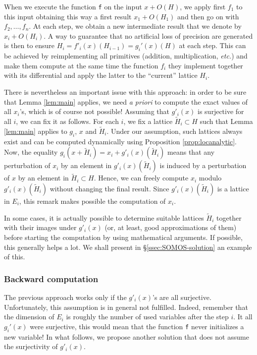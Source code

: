 \documentclass{lms}
\begin{document}
When we execute the function {\tt f} on the input $x + O(H)$, we apply 
first $f_1$ to this input obtaining this way a first result $x_1 + 
O(H_1)$ and then go on with $f_2, \ldots, f_n$. At each step, we obtain 
a new intermediate result that we denote by $x_i + O(H_i)$. A way to 
guarantee that no artificial loss of precision are generated is then to 
ensure $H_i = f'_i(x)(H_{i-1}) = g_i'(x)(H)$ at each step. This can be 
achieved by reimplementing all primitives (addition, multiplication, 
\emph{etc.}) and make them compute at the same time the function $f_i$
they implement together with its differential and apply the latter to
the ``current'' lattice $H_i$.

There is nevertheless an important issue with this approach: in order to 
be sure that Lemma \ref{lem:main} applies, we need \emph{a priori} to 
compute the exact values of all $x_i$'s, which is of course not possible! 
Assuming that $g'_i(x)$ is surjective for all $i$, we can fix it as 
follows. For each $i$, we fix a lattice $\tilde H_i \subset H$ such that 
Lemma \ref{lem:main} applies to $g_i$, $x$ and $\tilde H_i$. Under our 
assumption, such lattices always exist and can be computed dynamically 
using Proposition \ref{prop:locanalytic}. Now, the equality $g_i(x + 
\tilde H_i) = x_i + g'_i(x)(\tilde H_i)$ means that any perturbation of 
$x_i$ by an element in $g'_i(x) (\tilde H_i)$ is induced by a 
perturbation of $x$ by an element in $\tilde H_i \subset H$. Hence, we 
can freely compute $x_i$ modulo $g'_i(x) (\tilde H_i)$ without changing 
the final result. Since $g'_i(x)(\tilde H_i)$ is a lattice in $E_i$, this 
remark makes possible the computation of $x_i$.

\begin{rmk}
In some cases, it is actually possible to determine suitable lattices 
$\tilde H_i$ together with their images under $g'_i(x)$ (or, at
least, good approximations of them) before starting the computation 
by using mathematical arguments. If possible, this generally helps a
lot. We shall present in \S \ref{ssec:SOMOS-solution} an example of 
this.
\end{rmk}

\subsubsection*{Backward computation}

The previous approach works only if the $g'_i(x)$'s are all surjective. 
Unfortunately, this assumption is in general not fulfilled. Indeed, 
remember that the dimension of $E_i$ is roughly the number of used 
variables after the step $i$. It all $g_i'(x)$ were surjective, this 
would mean that the function {\tt f} never initializes a new variable!
In what follows, we propose another solution that does not assume the
surjectivity of $g'_i(x)$.
\end{document}
